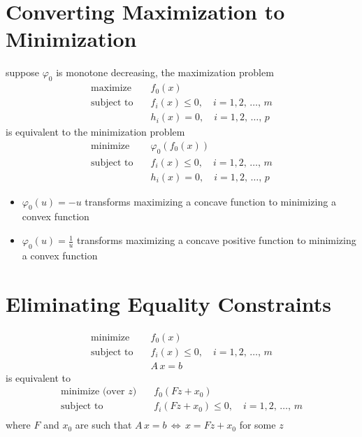 \documentclass[11pt]{extarticle}
\newcommand{\ds}{\displaystyle}
\newcommand{\ifff}{\,\Longleftrightarrow\,}
\theoremstyle{definition}
\begin{document}
\section*{Converting Maximization to Minimization}
suppose $\varphi_0$ is monotone decreasing, the maximization problem
\begin{align*}
  \text{maximize}\quad &f_0(x) \\
  \text{subject to}\quad &f_i(x)\leqslant 0, \quad i = 1, 2,\,\ldots,\,m \\
  \qquad\qquad &h_i(x) = 0, \quad i = 1, 2,\,\ldots,\,p
\end{align*} 
is equivalent to the minimization problem
\begin{align*}
  \text{minimize}\quad &\varphi_0(f_0(x)) \\
  \text{subject to}\quad &f_i(x)\leqslant 0, \quad i = 1, 2,\,\ldots,\,m \\
  \qquad\qquad &h_i(x) = 0, \quad i = 1, 2,\,\ldots,\,p
\end{align*} 
\vspace{-2em}
\begin{itemize}
  \item $\ds\varphi_0(u) = -u$ transforms maximizing a concave function to minimizing a convex function
  \item $\ds\varphi_0(u) = \frac{1}{u}$ transforms maximizing a concave positive function to minimizing a convex function
\end{itemize}

\section*{Eliminating Equality Constraints}
\begin{align*}
  \text{minimize}\quad &f_0(x) \\
  \text{subject to}\quad &f_i(x)\leqslant 0, \quad i = 1, 2,\,\ldots,\,m \\
  \qquad\qquad & A\,x = b
\end{align*} 
is equivalent to 
\begin{align*}
  \text{minimize (over $z$)}\quad &f_0(F z + x_0) \\
  \text{subject to}\quad &f_i(F z + x_0)\leqslant 0, \quad i = 1, 2,\,\ldots,\,m \\
\end{align*} 
where $F$ and $x_0$ are such that $\ds A\,x = b\ifff x = Fz + x_0$ for some $z$
\end{document}
